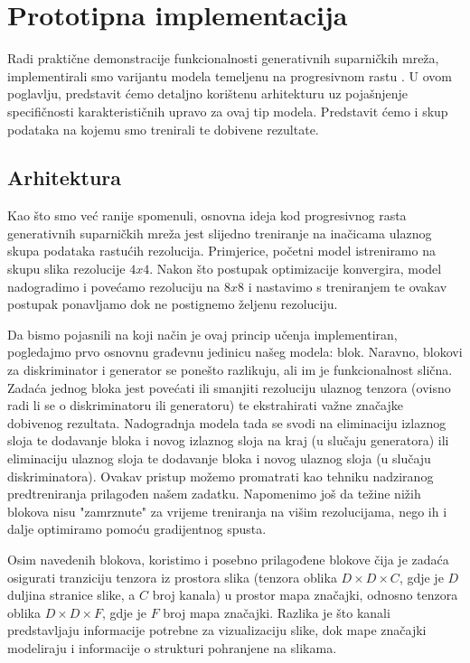 \chapter{Prototipna implementacija}
Radi praktične demonstracije funkcionalnosti generativnih suparničkih mreža, implementirali smo varijantu modela temeljenu na progresivnom rastu . U ovom poglavlju, predstavit ćemo detaljno korištenu arhitekturu uz pojašnjenje specifičnosti karakterističnih upravo za ovaj tip modela. Predstavit ćemo i skup podataka na kojemu smo trenirali te dobivene rezultate.

\section{Arhitektura}
Kao što smo već ranije spomenuli, osnovna ideja kod progresivnog rasta generativnih suparničkih mreža jest slijedno treniranje na inačicama ulaznog skupa podataka rastućih rezolucija. Primjerice, početni model istreniramo na skupu slika rezolucije $4x4$. Nakon što postupak optimizacije konvergira, model nadogradimo i povećamo rezoluciju na $8x8$ i nastavimo s treniranjem te ovakav postupak ponavljamo dok ne postignemo željenu rezoluciju.

Da bismo pojasnili na koji način je ovaj princip učenja implementiran, pogledajmo prvo osnovnu građevnu jedinicu našeg modela: blok.  Naravno, blokovi za diskriminator i generator se ponešto razlikuju, ali im je funkcionalnost slična. Zadaća jednog bloka jest povećati ili smanjiti rezoluciju ulaznog tenzora (ovisno radi li se o diskriminatoru ili generatoru) te ekstrahirati važne značajke dobivenog rezultata. Nadogradnja modela tada se svodi na eliminaciju izlaznog sloja te dodavanje bloka i novog izlaznog sloja na kraj (u slučaju generatora) ili eliminaciju ulaznog sloja te dodavanje bloka i novog ulaznog sloja (u slučaju diskriminatora). Ovakav pristup možemo promatrati kao tehniku nadziranog predtreniranja  prilagođen našem zadatku. Napomenimo još da težine nižih blokova nisu "zamrznute" za vrijeme treniranja na višim rezolucijama, nego ih i dalje optimiramo pomoću gradijentnog spusta.

Osim navedenih blokova, koristimo i posebno prilagođene blokove čija je zadaća osigurati tranziciju tenzora iz prostora slika (tenzora oblika $D \times D \times C$, gdje je $D$ duljina stranice slike, a $C$ broj kanala) u prostor mapa značajki, odnosno tenzora oblika $D \times D \times F$, gdje je $F$ broj mapa značajki. Razlika je što kanali predstavljaju informacije potrebne za vizualizaciju slike, dok mape značajki modeliraju i informacije o strukturi pohranjene na slikama.  

